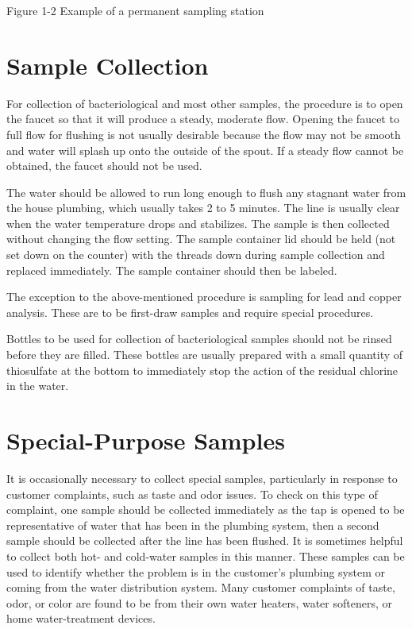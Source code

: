 \documentclass[10pt]{article}
\begin{document}
Figure 1-2 Example of a permanent sampling station

\section{Sample Collection}
For collection of bacteriological and most other samples, the procedure is to open the faucet so that it will produce a steady, moderate flow. Opening the faucet to full flow for flushing is not usually desirable because the flow may not be smooth and water will splash up onto the outside of the spout. If a steady flow cannot be obtained, the faucet should not be used.

The water should be allowed to run long enough to flush any stagnant water from the house plumbing, which usually takes 2 to 5 minutes. The line is usually clear when the water temperature drops and stabilizes. The sample is then collected without changing the flow setting. The sample container lid should be held (not set down on the counter) with the threads down during sample collection and replaced immediately. The sample container should then be labeled.

The exception to the above-mentioned procedure is sampling for lead and copper analysis. These are to be first-draw samples and require special procedures.

Bottles to be used for collection of bacteriological samples should not be rinsed before they are filled. These bottles are usually prepared with a small quantity of thiosulfate at the bottom to immediately stop the action of the residual chlorine in the water.

\section{Special-Purpose Samples}
It is occasionally necessary to collect special samples, particularly in response to customer complaints, such as taste and odor issues. To check on this type of complaint, one sample should be collected immediately as the tap is opened to be representative of water that has been in the plumbing system, then a second sample should be collected after the line has been flushed. It is sometimes helpful to collect both hot- and cold-water samples in this manner. These samples can be used to identify whether the problem is in the customer's plumbing system or coming from the water distribution system. Many customer complaints of taste, odor, or color are found to be from their own water heaters, water softeners, or home water-treatment devices.
\end{document}
